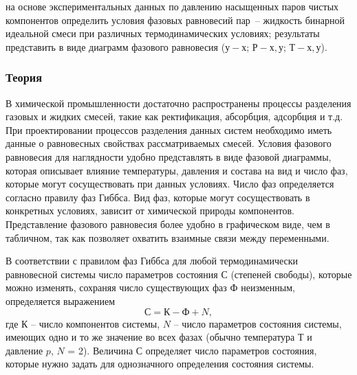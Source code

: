 
\goal на основе экспериментальных данных по давлению насыщенных паров чистых компонентов определить условия фазовых равновесий пар~-- жидкость бинарной идеальной смеси при различных термодинамических условиях; результаты представить в виде диаграмм фазового равновесия ($у-х$; $Р-х, у$; $Т-х, у$).

\subsubsection{Теория}

В химической промышленности достаточно распространены процессы разделения газовых и жидких смесей, такие как ректификация, абсорбция, адсорбция и т.д. При проектировании процессов разделения данных систем необходимо иметь данные о равновесных свойствах рассматриваемых смесей. Условия фазового равновесия для наглядности удобно представлять в виде фазовой диаграммы, которая описывает влияние температуры, давления и состава на вид и число фаз, которые могут сосуществовать при данных условиях. Число фаз определяется согласно правилу фаз Гиббса. Вид фаз, которые могут сосуществовать в конкретных условиях, зависит от химической природы компонентов. Представление фазового равновесия более удобно в графическом виде, чем в табличном, так как позволяет охватить взаимные связи между переменными.

В соответствии с правилом фаз Гиббса для любой термодинамически равновесной системы число параметров состояния $С$ (степеней свободы), которые можно изменять, сохраняя число существующих фаз $Ф$ неизменным, определяется выражением
\begin{equation}
С=К-Ф+N,
\end{equation}
где $К$ – число компонентов системы, $N$ – число параметров состояния системы, имеющих одно и то же значение во всех фазах (обычно температура $Т$ и давление $p$, $N$ = 2). Величина $С$ определяет число параметров состояния, которые нужно задать для однозначного определения состояния системы.

